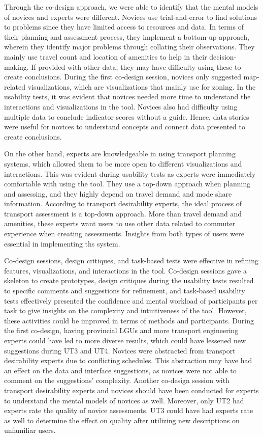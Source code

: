 \documentclass{sigchi}
\begin{document}
Through the co-design approach, we were able to identify that the mental models of novices and experts were different. Novices use trial-and-error to find solutions to problems since they have limited access to resources and data. In terms of their planning and assessment process, they implement a bottom-up approach, wherein they identify major problems through collating their observations. They mainly use travel count and location of amenities to help in their decision-making. If provided with other data, they may have difficulty using these to create conclusions. During the first co-design session, novices only suggested map-related visualizations, which are visualizations that mainly use for zoning. In the usability tests, it was evident that novices needed more time to understand the interactions and visualizations in the tool. Novices also had difficulty using multiple data to conclude indicator scores without a guide. Hence, data stories were useful for novices to understand concepts and connect data presented to create conclusions. 

On the other hand, experts are knowledgeable in using transport planning systems, which allowed them to be more open to different visualizations and interactions. This was evident during usability tests as experts were immediately comfortable with using the tool. They use a top-down approach when planning and assessing, and they highly depend on travel demand and mode share information. According to transport desirability experts, the ideal process of transport assessment is a top-down approach. More than travel demand and amenities, these experts want users to use other data related to commuter experience when creating assessments. Insights from both types of users were essential in implementing ths system.

Co-design sessions, design critiques, and task-based tests were effective in refining features, visualizations, and interactions in the tool. Co-design sessions gave a skeleton to create prototypes, design critiques during the usability tests resulted to specific comments and suggestions for refinement, and task-based usability tests effectively presented the confidence and mental workload of participants per task to give insights on the complexity and intuitiveness of the tool. However, these activities could be improved in terms of methods and participants. During the first co-design, having provincial LGUs and more transport engineering experts could have led to more diverse results, which could have lessened new suggestions during UT3 and UT4. Novices were abstracted from transport desirability experts due to conflicting schedules. This abstraction may have had an effect on the data and interface suggestions, as novices were not able to comment on the suggestions' complexity. Another co-design session with transport desirability experts and novices should have been conducted for experts to understand the mental models of novices as well. Moreover, only UT2 had experts rate the quality of novice assessments. UT3 could have had experts rate as well to determine the effect on quality after utilizing new descriptions on unfamiliar users.
\end{document}
